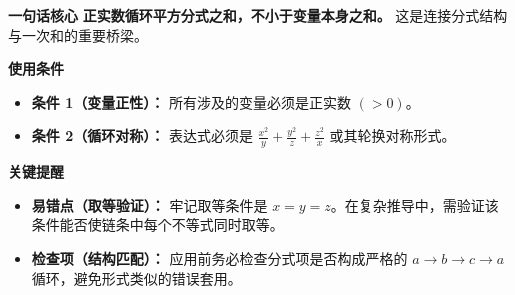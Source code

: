\begin{summarybox}
\textbf{\textcolor{CSummary}{一句话核心}}
\textbf{正实数循环平方分式之和，不小于变量本身之和。} 这是连接分式结构与一次和的重要桥梁。

\medskip
\textbf{\textcolor{CSummary}{使用条件}}
\begin{itemize}[leftmargin=*, itemsep=0.5em, topsep=0.4em]
    \item \textbf{条件 1（变量正性）：} 所有涉及的变量必须是正实数 $(>0)$。
    \item \textbf{条件 2（循环对称）：} 表达式必须是 $\frac{x^2}{y} + \frac{y^2}{z} + \frac{z^2}{x}$ 或其轮换对称形式。
\end{itemize}

\medskip
\textbf{\textcolor{CSummary}{关键提醒}}
\begin{itemize}[leftmargin=*, itemsep=0.5em, topsep=0.4em]
    \item \textbf{易错点（取等验证）：} 牢记取等条件是 $x=y=z$。在复杂推导中，需验证该条件能否使链条中每个不等式同时取等。
    \item \textbf{检查项（结构匹配）：} 应用前务必检查分式项是否构成严格的 $a\to b\to c\to a$ 循环，避免形式类似的错误套用。
\end{itemize}
\end{summarybox}
